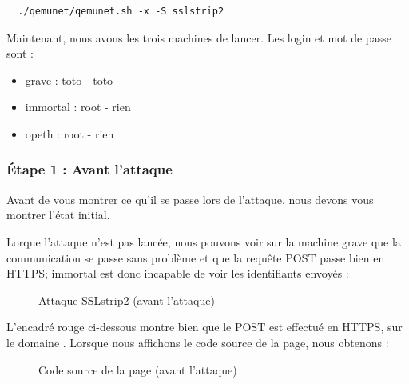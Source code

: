 \begin{verbatim}
  ./qemunet/qemunet.sh -x -S sslstrip2
\end{verbatim}

Maintenant, nous avons les trois machines de lancer. Les login et mot de passe sont :

\begin{itemize}
\item grave : toto - toto
\item immortal : root - rien
\item opeth : root - rien
\end{itemize}

\subsubsection{Étape 1 : Avant l'attaque}

Avant de vous montrer ce qu'il se passe lors de l'attaque, nous devons vous montrer l'état initial.

Lorque l'attaque n'est pas lancée, nous pouvons voir sur la machine grave que la communication se passe sans problème et que la requête POST passe bien en HTTPS; immortal est donc incapable de voir les identifiants envoyés :

\begin{figure}[H]
  \caption{Attaque SSLstrip2 (avant l'attaque)}
\end{figure}

L'encadré rouge ci-dessous montre bien que le POST est effectué en HTTPS, sur le domaine . Lorsque nous affichons le code source de la page, nous obtenons :

\begin{figure}[H]
  \caption{Code source de la page (avant l'attaque)}
\end{figure}

